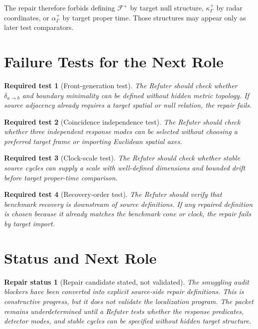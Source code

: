 \documentclass[11pt]{article}
\newcommand{\Front}{\mathcal{F}}
\newtheorem{test}{Required test}
\newtheorem{status}{Repair status}
\begin{document}
The repair therefore forbids defining \(\Front^{+}\) by target null structure,
\(\kappa^{+}_{\Gamma}\) by radar coordinates, or \(\alpha^{+}_{\Gamma}\) by
target proper time. Those structures may appear only as later test comparators.

\section{Failure Tests for the Next Role}

\begin{test}[Front-generation test]
The Refuter should check whether \(\delta_{a\to b}\) and boundary minimality
can be defined without hidden metric topology. If source adjacency already
requires a target spatial or null relation, the repair fails.
\end{test}

\begin{test}[Coincidence independence test]
The Refuter should check whether three independent response modes can be
selected without choosing a preferred target frame or importing Euclidean
spatial axes.
\end{test}

\begin{test}[Clock-scale test]
The Refuter should check whether stable source cycles can supply a scale with
well-defined dimensions and bounded drift before target proper-time
comparison.
\end{test}

\begin{test}[Recovery-order test]
The Refuter should verify that benchmark recovery is downstream of source
definitions. If any repaired definition is chosen because it already matches
the benchmark cone or clock, the repair fails by target import.
\end{test}

\section{Status and Next Role}

\begin{status}[Repair candidate stated, not validated]
The smuggling audit blockers have been converted into explicit source-side
repair definitions. This is constructive progress, but it does not validate
the localization program. The packet remains underdetermined until a Refuter
tests whether the response predicates, detector modes, and stable cycles can be
specified without hidden target structure.
\end{status}
\end{document}
